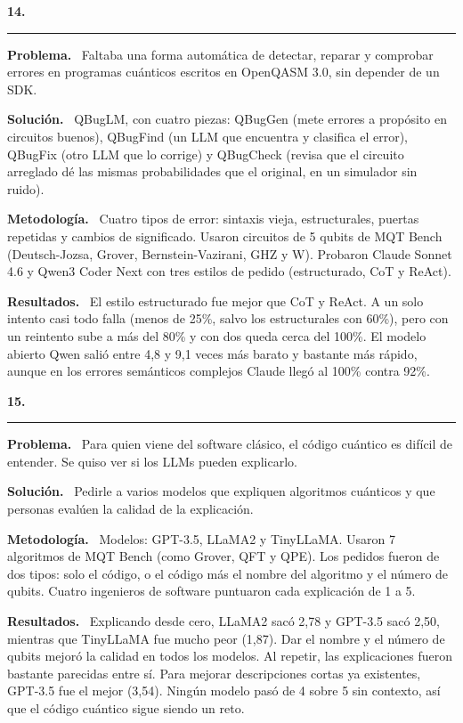 \documentclass[11pt,a4paper]{article}
\newcommand{\paper}[1]{\vspace{1.2em}\par{\large\textbf{#1}}\par\vspace{0.2em}\hrule\vspace{0.4em}}
\newcommand{\parte}[1]{\par\textbf{#1.}\ }
\begin{document}
\paper{14.}

\parte{Problema}
Faltaba una forma automática de detectar, reparar y comprobar errores en programas cuánticos escritos en OpenQASM 3.0, sin depender de un SDK.

\parte{Solución}
QBugLM, con cuatro piezas: QBugGen (mete errores a propósito en circuitos buenos), QBugFind (un LLM que encuentra y clasifica el error), QBugFix (otro LLM que lo corrige) y QBugCheck (revisa que el circuito arreglado dé las mismas probabilidades que el original, en un simulador sin ruido).

\parte{Metodología}
Cuatro tipos de error: sintaxis vieja, estructurales, puertas repetidas y cambios de significado. Usaron circuitos de 5 qubits de MQT Bench (Deutsch-Jozsa, Grover, Bernstein-Vazirani, GHZ y W). Probaron Claude Sonnet 4.6 y Qwen3 Coder Next con tres estilos de pedido (estructurado, CoT y ReAct).

\parte{Resultados}
El estilo estructurado fue mejor que CoT y ReAct. A un solo intento casi todo falla (menos de 25\%, salvo los estructurales con 60\%), pero con un reintento sube a más del 80\% y con dos queda cerca del 100\%. El modelo abierto Qwen salió entre 4,8 y 9,1 veces más barato y bastante más rápido, aunque en los errores semánticos complejos Claude llegó al 100\% contra 92\%.

\paper{15.}

\parte{Problema}
Para quien viene del software clásico, el código cuántico es difícil de entender. Se quiso ver si los LLMs pueden explicarlo.

\parte{Solución}
Pedirle a varios modelos que expliquen algoritmos cuánticos y que personas evalúen la calidad de la explicación.

\parte{Metodología}
Modelos: GPT-3.5, LLaMA2 y TinyLLaMA. Usaron 7 algoritmos de MQT Bench (como Grover, QFT y QPE). Los pedidos fueron de dos tipos: solo el código, o el código más el nombre del algoritmo y el número de qubits. Cuatro ingenieros de software puntuaron cada explicación de 1 a 5.

\parte{Resultados}
Explicando desde cero, LLaMA2 sacó 2,78 y GPT-3.5 sacó 2,50, mientras que TinyLLaMA fue mucho peor (1,87). Dar el nombre y el número de qubits mejoró la calidad en todos los modelos. Al repetir, las explicaciones fueron bastante parecidas entre sí. Para mejorar descripciones cortas ya existentes, GPT-3.5 fue el mejor (3,54). Ningún modelo pasó de 4 sobre 5 sin contexto, así que el código cuántico sigue siendo un reto.
\end{document}
